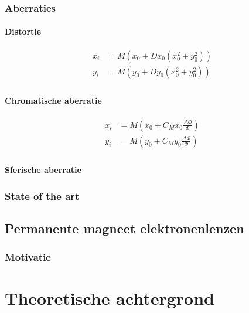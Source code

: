 \documentclass[we,twoside,openright,a4paper,11pt]{uantwerpenbamathesis}
\begin{document}
\subsection{Aberraties}

\subsubsection{Distortie}
\cite{PWHawkes}
\begin{equation}\label{eq:distortion}
    \begin{split}
        x_i & = M\left(x_0+Dx_0\left(x_0^2+y_0^2\right)\right)\\
        y_i & = M\left(y_0+Dy_0\left(x_0^2+y_0^2\right)\right)\\
    \end{split}
\end{equation}

\subsubsection{Chromatische aberratie}
\begin{equation}\label{eq:chr_ab}
    \begin{split}
        x_i & = M\left(x_0+C_Mx_0\frac{\Delta\Phi}{\Phi}\right)\\
        y_i & = M\left(y_0+C_My_0\frac{\Delta\Phi}{\Phi}\right)\\
    \end{split}
\end{equation}

\subsubsection{Sferische aberratie}

\subsection{State of the art}

\section{Permanente magneet elektronenlenzen}
\subsection{Motivatie}

\chapter{Theoretische achtergrond}\label{ch:theorie}
\end{document}
